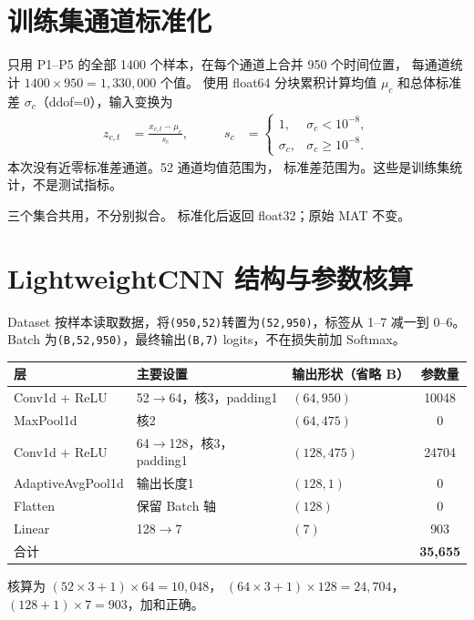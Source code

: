\documentclass[UTF8,zihao=-4,fontset=none]{ctexart}
\newcommand{\nextsection}{\FloatBarrier\Needspace{5\baselineskip}}
\begin{document}
\FloatBarrier{}
\section{训练集通道标准化}
只用 P1--P5 的全部 1400 个样本，在每个通道上合并 950 个时间位置，
每通道统计 $1400\times950=1{,}330{,}000$ 个值。
使用 float64 分块累积计算均值 $\mu_c$ 和总体标准差 $\sigma_c$（ddof=0），输入变换为
\begin{equation}\label{eq:normalization}
\begin{alignedat}{2}
z_{c,t}&=\frac{x_{c,t}-\mu_c}{s_c}, &\qquad s_c&=
\begin{cases}
1,        & \sigma_c<10^{-8},\\[4pt]
\sigma_c, & \sigma_c\geq10^{-8}.
\end{cases}
\end{alignedat}
\end{equation}
本次没有近零标准差通道。52 通道均值范围为\MeanRange{}，
标准差范围为\StdRange{}。这些是训练集统计，不是测试指标。

三个集合共用，不分别拟合。
标准化后返回 float32；原始 MAT 不变。

\nextsection
\section{LightweightCNN 结构与参数核算}
Dataset 按样本读取数据\cite{pytorchdata}，将\texttt{(950,52)}转置为\texttt{(52,950)}，标签从 1--7 减一到 0--6。
Batch 为\texttt{(B,52,950)}，最终输出\texttt{(B,7)} logits，不在损失前加 Softmax\cite{pytorchloss}。
\begin{center}\begin{minipage}{\linewidth}\centering\small
{}
\begin{tabular}{lll S[table-format=5.0]}\toprule
层 & 主要设置 & 输出形状（省略 B） & {参数量}\\\midrule
Conv1d + ReLU & 52$\to$64，核3，padding1 & $(64,950)$ & 10048\\
MaxPool1d & 核2 & $(64,475)$ & 0\\
Conv1d + ReLU & 64$\to$128，核3，padding1 & $(128,475)$ & 24704\\
AdaptiveAvgPool1d & 输出长度1 & $(128,1)$ & 0\\
Flatten & 保留 Batch 轴 & $(128)$ & 0\\
Linear & 128$\to$7 & $(7)$ & 903\\\midrule
合计 & & & {\textbf{35,655}}\\\bottomrule
\end{tabular}\end{minipage}\end{center}
核算为 $(52\times3+1)\times64=10{,}048$，
$(64\times3+1)\times128=24{,}704$，$(128+1)\times7=903$，加和正确。
\end{document}

